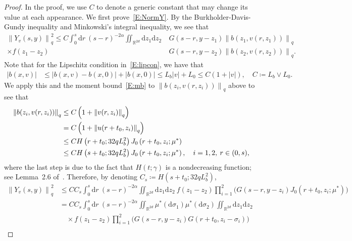 \documentclass[a4paper,11pt]{article}%
\theoremstyle{plain}
\theoremstyle{definition}
\numberwithin{equation}{section}
\newcommand{\R}{\mathbb{R}}
\newcommand{\Norm}[1]{\left\| #1 \right\|}
\newcommand{\ud}{\ensuremath{\mathrm{d}}}
\begin{document}
\begin{proof}
  In the proof, we use $C$ to denote a generic constant that may change its value at each
  appearance. We first prove~\eqref{E:NormY}. By the Burkholder-Davis-Gundy inequality and
  Minkowski's integral inequality, we see that
  \begin{align*}
    \Norm{Y_v(s,y)}_q^2 \le
    C \int_0^s \ud r \: (s-r)^{-2\alpha}
    \iint_{\R^{2d}} \ud z_1\ud z_2 \: & G(s-r,y-z_1) \Norm{b\left(z_1,v(r,z_1)\right)}_q \\
    \times f(z_1-z_2)                 & G(s-r,y-z_2) \Norm{b\left(z_2,v(r,z_2)\right)}_q.
  \end{align*}
  Note that for the Lipschitz condition in~\eqref{E:lipcon}, we have that
  \begin{align*}
    \left|b\left(x,v\right)\right|
    & \le \left|b\left(x,v\right) - b\left(x,0\right)\right| + \left|b\left(x,0\right)\right|
    \le L_b |v| + L_0 \le C (1+|v|),\quad C\coloneqq L_b\vee L_0.
  \end{align*}
  We apply this and the moment bound~\eqref{E:mb} to $\Norm{b(z_i, v(r,z_i))}_q$ above to see that
  \begin{align}\label{E:NormB}
    \Norm{b(z_i, v(r,z_i))}_q
    & \le C\left(1+\Norm{v(r,z_i)}_q\right)                               \notag \\
    & =   C\left(1+\Norm{u(r+t_0,z_i)}_q\right)                           \notag \\
    & \le C H\left(r+t_0;32qL_b^2\right) J_0\left(r + t_0,z_i;\mu^*\right)\notag \\
    & \le C H\left(s+t_0;32qL_b^2\right) J_0\left(r + t_0,z_i;\mu^*\right), \quad i = 1,2, \: r\in(0,s),
  \end{align}
  where the last step is due to the fact that $H(t;\gamma)$ is a nondecreasing function; see Lemma~2.6 of~\cite{chen.kim:19:nonlinear}. Therefore, by denoting $C_s \coloneqq
  H\left(s+t_0;32qL_b^2\right)$,
  \begin{align*}
    \Norm{Y_v(s,y)}_q^2
    & \le C C_s \int_0^s \ud r \: (s-r)^{-2\alpha} \iint_{\R^{2d}} \ud z_1\ud z_2\: f(z_1-z_2) \prod_{i = 1}^2 \bigg(G(s-r,y-z_i) J_0\left(r + t_0,z_i;\mu^*\right)\bigg)      \\
    & = C C_s \int_0^s \ud r \: (s-r)^{-2\alpha} \iint_{\R^{2d}} \mu^* (\ud \sigma_1) \mu^* (\ud \sigma_2) \iint_{\R^{2d}} \ud z_1\ud z_2                                      \\
    & \quad \times f(z_1-z_2) \prod_{i = 1}^{2} \bigg(G(s-r,y-z_i)G(r + t_0,z_i-\sigma_i) \bigg)                                                                               \\

\end{align*}
\end{proof}
\end{document}
